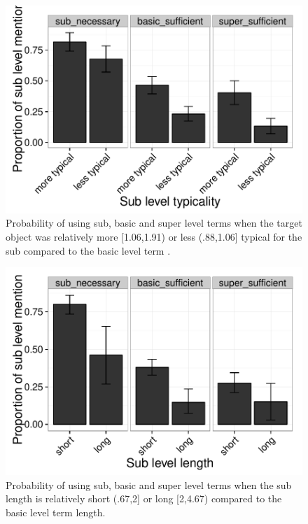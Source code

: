 \documentclass[10pt,letterpaper]{article}
\begin{document}

\begin{figure}[ht!]
\centering
\includegraphics[width=.5\textwidth]{graphs/typicality-effect}
\caption{Probability of using sub, basic and super level terms when the target object was relatively more [1.06,1.91) or less (.88,1.06] typical for the sub compared to the basic level term .}
 \label{fig:typicalityeffect}
\end{figure}


\begin{figure}[ht!]
\centering
\includegraphics[width=.5\textwidth]{graphs/length-effect}
\caption{Probability of using sub, basic and super level terms when the sub  length is relatively short (.67,2] or long [2,4.67) compared to the basic level term length.}
 \label{fig:lengtheffect}
\end{figure}
\end{document}
